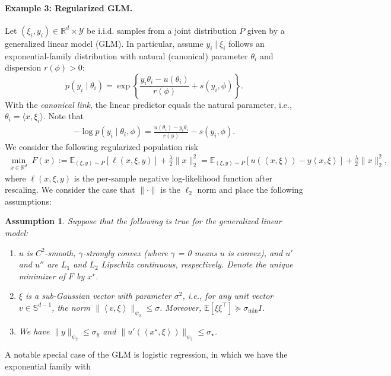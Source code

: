 \documentclass[11pt,twoside]{article}
\numberwithin{equation}{section}
\newcommand{\EE}{\mathbb{E}}
\newcommand{\RR}{\mathbb{R}}
\newcommand{\1}{\mathbf{1}}
\newcommand{\dotp}[1]{\left\langle #1\right\rangle}
\newtheorem{assumption}{Assumption}
\theoremstyle{remark}
\theoremstyle{plain}
\begin{document}
\paragraph{Example 3: Regularized GLM.}
Let $(\xi_i,y_i)\in\RR^d\times\mathcal Y$ be i.i.d. samples from a joint distribution $P$ given by a generalized linear model (GLM).
In particular, assume $y_i\mid \xi_i$ follows an exponential-family distribution with natural (canonical) parameter $\theta_i$ and dispersion $r(\phi)>0$:
$$
p(y_i\mid \theta_i)
=\exp\left\{\frac{y_i\theta_i-u(\theta_i)}{r(\phi)}+s(y_i,\phi)\right\}.
$$
With the \emph{canonical link}, the linear predictor equals the natural parameter, i.e.,  $\theta_i=\langle x,\xi_i\rangle.$ Note that 
\begin{align*}
- \log p(y_i \mid \theta_i, \phi) = \frac{u(\theta_i) - y_i\theta_i}{r(\phi)} - s(y_i,\phi).
\end{align*} 
We consider the following regularized population risk
\begin{align}\label{eqn:generalized_linear_model}
\min_{x\in\RR^d}\; F(x)
:= \EE_{(\xi,y)\sim P}[\ell(x,\xi,y)] +  \frac{\lambda}{2}\|x\|_2^2 = \EE_{(\xi,y)\sim P}\left[u(\dotp{x,\xi}) - y \dotp{x,\xi}\right] + \frac{\lambda}{2}\|x\|_2^2,
\end{align}
where $\ell(x,\xi, y)$ is the per-sample negative log-likelihood function after rescaling. 
We consider the case that $\|\cdot\|$ is the $\ell_2$ norm and place the following assumptions:
\begin{assumption}\label{assum:generalized_linear_model}
Suppose that the following is true for the generalized linear model:
\begin{enumerate}
	\item $u$ is $C^2$-smooth, $\gamma$-strongly convex (where $\gamma$ = 0 means $u$ is convex), and $u'$ and $u''$ are $L_1$ and $L_2$ Lipschitz continuous, respectively. Denote the unique minimizer of $F$ by $x^\star$.
	\item  $\xi$ is a sub-Gaussian vector with parameter $\sigma^2$, i.e., for any unit vector $v \in \mathbb{S}^{d-1}$, the  norm $\|\dotp{v,\xi}\|_{\psi_2} \le \sigma$.  Moreover, $\EE[\xi \xi^\top] \succeq \sigma_{\min} I$.
	\item We have $\|y\|_{\psi_2} \le \sigma_y$ and $ \|u'(\dotp{x^\star, \xi})\|_{\psi_2} \le \sigma_\star$.
\end{enumerate} 
\end{assumption}
A notable special case of the GLM is logistic regression, in which we have the exponential family with
\end{document}
